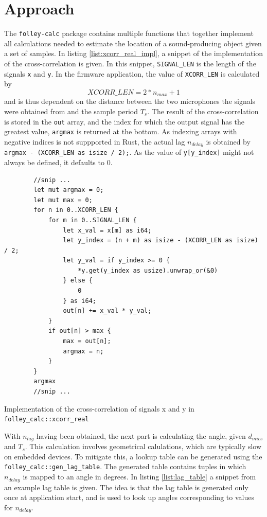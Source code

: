 \documentclass[a4paper]{article}
\newcommand{\rust}[1]{\texttt{#1}}
\begin{document}
\section{Approach}

The \texttt{folley-calc} package contains multiple functions that together implement all calculations needed to estimate the location of a sound-producing object given a set of samples. In listing \ref{list:xcorr_real_impl}, a snippet of the implementation of the cross-correlation is given. In this snippet, \rust{SIGNAL_LEN} is the length of the signals \rust{x} and \rust{y}. In the firmware application, the value of \rust{XCORR_LEN} is calculated by \[XCORR\_LEN = 2 * n_{max} + 1\] and is thus dependent on the distance between the two microphones the signals were obtained from and the sample period $T_s$. The result of the cross-correlation is stored in the \rust{out} array, and the index for which the output signal has the greatest value, \rust{argmax} is returned at the bottom. As indexing arrays with negative indices is not suppported in Rust, the actual lag $n_{delay}$ is obtained by \rust{argmax - (XCORR_LEN as isize / 2);}. As the value of \rust{y[y_index]} might not always be defined, it defaults to $0$.

\begin{listing}[H]
    \begin{verbatim}
        //snip ...
        let mut argmax = 0;
        let mut max = 0;
        for n in 0..XCORR_LEN {
            for m in 0..SIGNAL_LEN {
                let x_val = x[m] as i64;
                let y_index = (n + m) as isize - (XCORR_LEN as isize) / 2;
                let y_val = if y_index >= 0 {
                    *y.get(y_index as usize).unwrap_or(&0)
                } else {
                    0
                } as i64;
                out[n] += x_val * y_val;
            }
            if out[n] > max {
                max = out[n];
                argmax = n;
            }
        }
        argmax
        //snip ...
    \end{verbatim}
    \caption{Implementation of the cross-correlation of signals x and y in \rust{folley_calc::xcorr_real}}
    \label{list:xcorr_real_impl}
\end{listing}

With $n_{lag}$ having been obtained, the next part is calculating the angle, given $d_{mics}$ and $T_s$. This calculation involves geometrical calulations, which are typically slow on embedded devices. To mitigate this, a lookup table can be generated using the \rust{folley_calc::gen_lag_table}. The generated table contains tuples in which $n_{delay}$ is mapped to an angle in degrees. In listing \ref{list:lag_table} a snippet from an example lag table is given. The idea is that the lag table is generated only once at application start, and is used to look up angles corresponding to values for $n_{delay}$.
\end{document}
